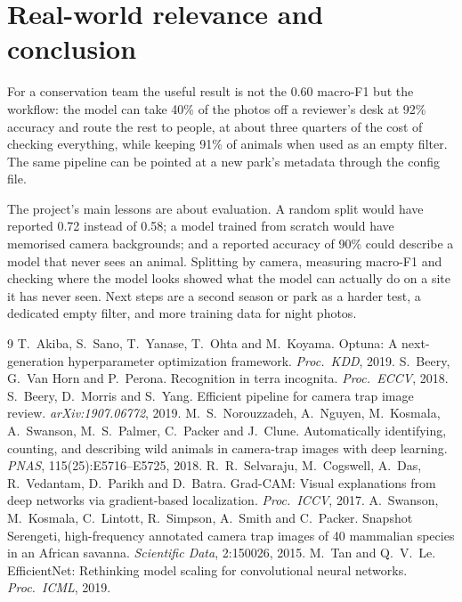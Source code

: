 \documentclass[11pt,a4paper]{article}
\begin{document}
\section{Real-world relevance and conclusion}
For a conservation team the useful result is not the 0.60 macro-F1 but the workflow: the model can take
40\% of the photos off a reviewer's desk at 92\% accuracy and route the rest to people, at about three
quarters of the cost of checking everything, while keeping 91\% of animals when used as an empty filter.
The same pipeline can be pointed at a new park's metadata through the config file.

The project's main lessons are about evaluation. A random split would have reported 0.72 instead of 0.58;
a model trained from scratch would have memorised camera backgrounds; and a reported accuracy of 90\%
could describe a model that never sees an animal. Splitting by camera, measuring macro-F1 and checking
where the model looks showed what the model can actually do on a site it has never seen. Next steps are a
second season or park as a harder test, a dedicated empty filter, and more training data for night photos.

\begin{thebibliography}{9}\small
{} T.~Akiba, S.~Sano, T.~Yanase, T.~Ohta and M.~Koyama. Optuna: A next-generation
hyperparameter optimization framework. \emph{Proc.\ KDD}, 2019.
 S.~Beery, G.~Van Horn and P.~Perona. Recognition in terra incognita.
\emph{Proc.\ ECCV}, 2018.
 S.~Beery, D.~Morris and S.~Yang. Efficient pipeline for camera trap image review.
\emph{arXiv:1907.06772}, 2019.
 M.~S.~Norouzzadeh, A.~Nguyen, M.~Kosmala, A.~Swanson, M.~S.~Palmer, C.~Packer
and J.~Clune. Automatically identifying, counting, and describing wild animals in camera-trap images with
deep learning. \emph{PNAS}, 115(25):E5716--E5725, 2018.
 R.~R.~Selvaraju, M.~Cogswell, A.~Das, R.~Vedantam, D.~Parikh and D.~Batra.
Grad-CAM: Visual explanations from deep networks via gradient-based localization. \emph{Proc.\ ICCV}, 2017.
 A.~Swanson, M.~Kosmala, C.~Lintott, R.~Simpson, A.~Smith and C.~Packer. Snapshot
Serengeti, high-frequency annotated camera trap images of 40 mammalian species in an African savanna.
\emph{Scientific Data}, 2:150026, 2015.
 M.~Tan and Q.~V.~Le. EfficientNet: Rethinking model scaling for convolutional neural
networks. \emph{Proc.\ ICML}, 2019.
\end{thebibliography}
\end{document}
